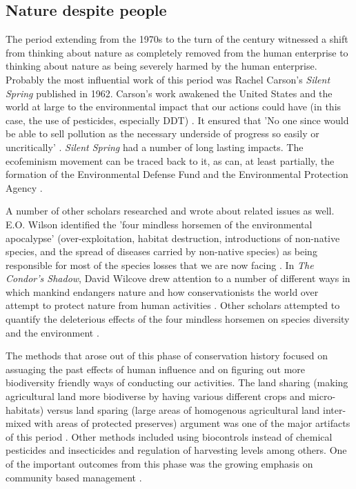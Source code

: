 \documentclass[rutwik_proposal.tex]{subfiles}
\begin{document}
\subsection{Nature despite people}\label{subsec:pplharmnature}

The period extending from the 1970s to the turn of the century witnessed a shift from thinking about nature as completely removed from the human enterprise to thinking about nature as being severely harmed by the human enterprise. Probably the most influential work of this period was Rachel Carson's \textit{Silent Spring} published in 1962. Carson's work awakened the United States and the world at large to the environmental impact that our actions could have (in this case, the use of pesticides, especially DDT) \cite{Carson02}. It ensured that 'No one since would be able to sell pollution as the necessary underside of progress so easily or uncritically' \cite{Hynes89}. \textit{Silent Spring} had a number of long lasting impacts. The ecofeminism movement can be traced back to it, as can, at least partially, the formation of the Environmental Defense Fund and the Environmental Protection Agency \cite{Hynes89}.

A number of other scholars researched and wrote about related issues as well. E.O. Wilson identified the 'four mindless horsemen of the environmental apocalypse' (over-exploitation, habitat destruction, introductions of non-native species, and the spread of diseases carried by non-native species) as being responsible for most of the species losses that we are now facing \cite{Wilson92}. In \textit{The Condor's Shadow}, David Wilcove drew attention to a number of different ways in which mankind endangers nature and how conservationists the world over attempt to protect nature from human activities \cite{Wilcove00}. Other scholars attempted to quantify the deleterious effects of the four mindless horsemen on species diversity and the environment \cite{Ehrlich94, Wilcove98, Brendan11, Vitousek97, Wilcove13, Poland06, Anagnostakis87, Greenberg14}.

The methods that arose out of this phase of conservation history focused on assuaging the past effects of human influence and on figuring out more biodiversity friendly ways of conducting our activities. The land sharing (making agricultural land more biodiverse by having various different crops and micro-habitats) versus land sparing (large areas of homogenous agricultural land inter-mixed with areas of protected preserves) argument was one of the major artifacts of this period \cite{Phalan11, Fischer08, Fischer14}. Other methods included using biocontrols instead of chemical pesticides and insecticides \cite{Handelsmann96} and regulation of harvesting levels among others. One of the important outcomes from this phase was the growing emphasis on community based management \cite{Hutton05}.
\end{document}
